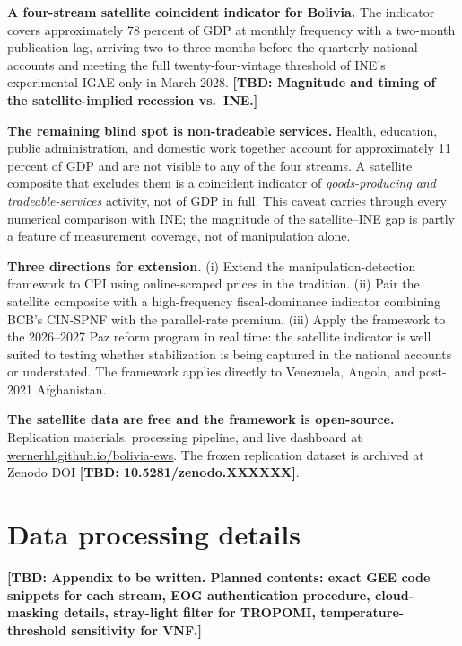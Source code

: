 \documentclass[11pt,letterpaper]{article}
\newcommand{\tbdline}[1]{\textcolor{yellow!60!black}{\textbf{[TBD: #1]}}}
\newcommand{\claim}[1]{\textbf{#1.}}
\begin{document}
\claim{A four-stream satellite coincident indicator for Bolivia} The indicator covers approximately \num{78} percent of GDP at monthly frequency with a two-month publication lag, arriving two to three months before the quarterly national accounts and meeting the full twenty-four-vintage threshold of INE's experimental IGAE only in March \num{2028}. \tbdline{Magnitude and timing of the satellite-implied recession vs.\ INE.}

\claim{The remaining blind spot is non-tradeable services} Health, education, public administration, and domestic work together account for approximately \num{11} percent of GDP and are not visible to any of the four streams. A satellite composite that excludes them is a coincident indicator of \emph{goods-producing and tradeable-services} activity, not of GDP in full. This caveat carries through every numerical comparison with INE; the magnitude of the satellite--INE gap is partly a feature of measurement coverage, not of manipulation alone.

\claim{Three directions for extension} (i) Extend the manipulation-detection framework to CPI using online-scraped prices in the \citet{cavallo2013} tradition. (ii) Pair the satellite composite with a high-frequency fiscal-dominance indicator combining BCB's CIN-SPNF with the parallel-rate premium. (iii) Apply the framework to the \numrange{2026}{2027} Paz reform program in real time: the satellite indicator is well suited to testing whether stabilization is being captured in the national accounts or understated. The framework applies directly to Venezuela, Angola, and post-\num{2021} Afghanistan.

\claim{The satellite data are free and the framework is open-source} Replication materials, processing pipeline, and live dashboard at \url{wernerhl.github.io/bolivia-ews}. The frozen replication dataset is archived at Zenodo DOI \tbdline{10.5281/zenodo.XXXXXX}.

\appendix

\section{Data processing details}
\label{app:data}

\tbdline{Appendix to be written. Planned contents: exact GEE code snippets for each stream, EOG authentication procedure, cloud-masking details, stray-light filter for TROPOMI, temperature-threshold sensitivity for VNF.}
\end{document}
